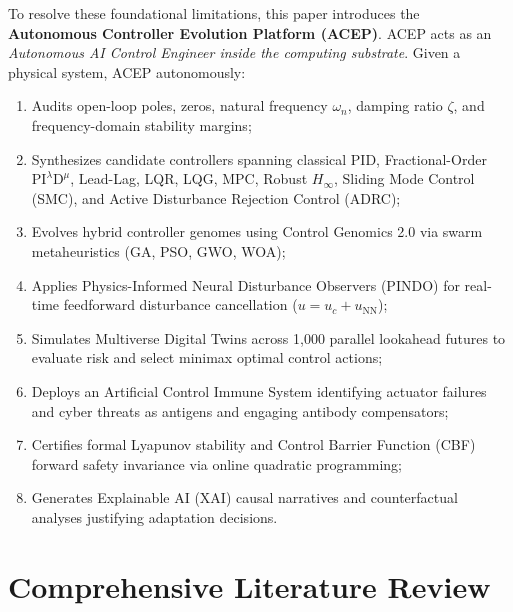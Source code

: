 \documentclass[journal,twocolumn]{IEEEtran}
\begin{document}
To resolve these foundational limitations, this paper introduces the \textbf{Autonomous Controller Evolution Platform (ACEP)}. ACEP acts as an \textit{Autonomous AI Control Engineer inside the computing substrate}. Given a physical system, ACEP autonomously:
\begin{enumerate}
    \item Audits open-loop poles, zeros, natural frequency $\omega_n$, damping ratio $\zeta$, and frequency-domain stability margins;
    \item Synthesizes candidate controllers spanning classical PID, Fractional-Order $\text{PI}^\lambda \text{D}^\mu$, Lead-Lag, LQR, LQG, MPC, Robust $H_\infty$, Sliding Mode Control (SMC), and Active Disturbance Rejection Control (ADRC);
    \item Evolves hybrid controller genomes using Control Genomics 2.0 via swarm metaheuristics (GA, PSO, GWO, WOA);
    \item Applies Physics-Informed Neural Disturbance Observers (PINDO) for real-time feedforward disturbance cancellation ($u = u_c + u_{\text{NN}}$);
    \item Simulates Multiverse Digital Twins across 1,000 parallel lookahead futures to evaluate risk and select minimax optimal control actions;
    \item Deploys an Artificial Control Immune System identifying actuator failures and cyber threats as antigens and engaging antibody compensators;
    \item Certifies formal Lyapunov stability and Control Barrier Function (CBF) forward safety invariance via online quadratic programming;
    \item Generates Explainable AI (XAI) causal narratives and counterfactual analyses justifying adaptation decisions.
\end{enumerate}

\section{Comprehensive Literature Review}
\end{document}
